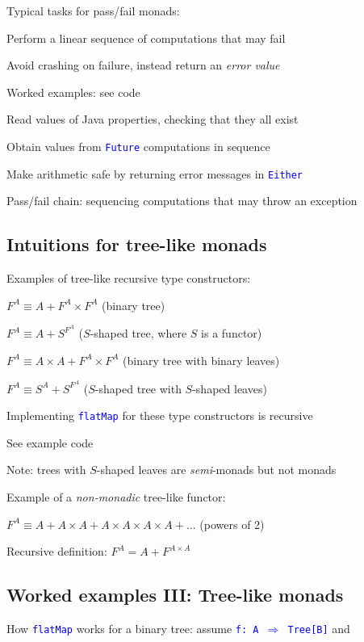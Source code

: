 Typical tasks for pass/fail monads:

Perform a linear sequence of computations that may fail

Avoid crashing on failure, instead return an \emph{error value}

Worked examples: see code

Read values of Java properties, checking that they all exist

Obtain values from \texttt{\textcolor{blue}{\footnotesize{}Future}}
computations in sequence

Make arithmetic safe by returning error messages in \texttt{\textcolor{blue}{\footnotesize{}Either}} 

Pass/fail chain: sequencing computations that may throw an exception


\subsection{Intuitions for tree-like monads}

Examples of tree-like recursive type constructors:

$F^{A}\equiv A+F^{A}\times F^{A}$ (binary tree)

$F^{A}\equiv A+S^{F^{A}}$ ($S$-shaped tree, where $S$ is a functor)

$F^{A}\equiv A\times A+F^{A}\times F^{A}$ (binary tree with binary
leaves)

$F^{A}\equiv S^{A}+S^{F^{A}}$ ($S$-shaped tree with $S$-shaped
leaves)

Implementing \texttt{\textcolor{blue}{\footnotesize{}flatMap}} for
these type constructors is recursive

See example code

Note: trees with $S$-shaped leaves are \emph{semi}-monads but not
monads

Example of a \emph{non-monadic} tree-like functor:

$F^{A}\equiv A+A\times A+A\times A\times A\times A+...$ (powers of
2)

Recursive definition: $F^{A}=A+F^{A\times A}$


\subsection{Worked examples III: Tree-like monads}

How \texttt{\textcolor{blue}{\footnotesize{}flatMap}} works for a
binary tree: assume \texttt{\textcolor{blue}{\footnotesize{}f:\ A
$\Rightarrow$ Tree{[}B{]}}} and


